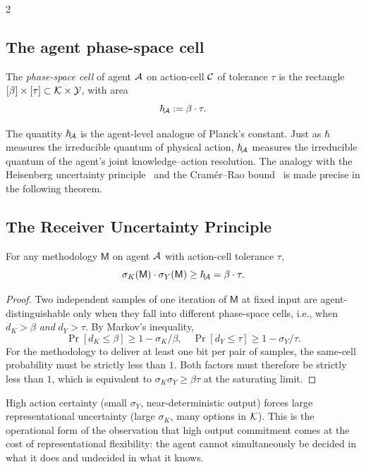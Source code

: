 \begin{multicols}{2}
\subsection{The agent phase-space cell}

\begin{definition}\label{def:ch05-phasecell}
The \emph{phase-space cell} of agent $\mathcal{A}$ on action-cell $\mathcal{C}$ of tolerance $\tau$
is the rectangle $[\beta] \times [\tau] \subset \mathcal{K} \times \mathcal{Y}$, with area
\[
\hbar_{\!\mathcal{A}} := \beta \cdot \tau.
\]
\end{definition}

The quantity $\hbar_{\!\mathcal{A}}$ is the agent-level analogue of Planck's constant. Just as $\hbar$
measures the irreducible quantum of physical action, $\hbar_{\!\mathcal{A}}$ measures the irreducible
quantum of the agent's joint knowledge--action resolution. The analogy with the
Heisenberg uncertainty principle~\citep{heisenberg1927,robertson1929} and the
Cram\'er--Rao bound~\citep{rao1945,cramer1946} is made precise in the following theorem.

\subsection{The Receiver Uncertainty Principle}

\begin{theorem}\label{thm:ch05-uncertainty}
For any methodology $\mathsf{M}$ on agent $\mathcal{A}$ with action-cell tolerance $\tau$,
\[
\sigma_K(\mathsf{M}) \cdot \sigma_Y(\mathsf{M}) \ge \hbar_{\!\mathcal{A}} = \beta \cdot \tau.
\]
\end{theorem}

\begin{proof}
Two independent samples of one iteration of $\mathsf{M}$ at fixed input are
agent-distinguishable only when they fall into different phase-space cells, i.e., when
$d_K > \beta$ \emph{and} $d_Y > \tau$. By Markov's inequality,
\[
\Pr[d_K \le \beta] \ge 1 - \sigma_K/\beta, \quad
\Pr[d_Y \le \tau] \ge 1 - \sigma_Y/\tau.
\]
For the methodology to deliver at least one bit per pair of samples, the same-cell
probability must be strictly less than $1$. Both factors must therefore be strictly less
than $1$, which is equivalent to $\sigma_K \sigma_Y \ge \beta\tau$ at the saturating
limit.
\end{proof}

\begin{remark}
High action certainty (small $\sigma_Y$, near-deterministic output) forces large
representational uncertainty (large $\sigma_K$, many options in $\mathcal{K}$). This is the
operational form of the observation that high output commitment comes at the cost of
representational flexibility: the agent cannot simultaneously be decided in what it
does and undecided in what it knows.
\end{remark}


\end{multicols}
